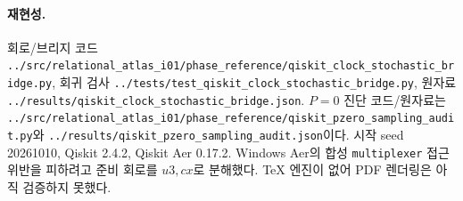 \documentclass[11pt,a4paper]{article}
\begin{document}
\paragraph{재현성.} 회로/브리지 코드
\texttt{../src/relational\_atlas\_i01/phase\_reference/qiskit\_clock\_stochastic\_bridge.py}, 회귀 검사
\texttt{../tests/test\_qiskit\_clock\_stochastic\_bridge.py}, 원자료
\texttt{../results/qiskit\_clock\_stochastic\_bridge.json}.
$P=0$ 진단 코드/원자료는
\texttt{../src/relational\_atlas\_i01/phase\_reference/qiskit\_pzero\_sampling\_audit.py}와
\texttt{../results/qiskit\_pzero\_sampling\_audit.json}이다.
시작 seed 20261010, Qiskit 2.4.2, Qiskit Aer 0.17.2.
Windows Aer의 합성 \texttt{multiplexer} 접근 위반을 피하려고
준비 회로를 $u3,cx$로 분해했다. TeX 엔진이 없어 PDF 렌더링은
아직 검증하지 못했다.
\end{document}
